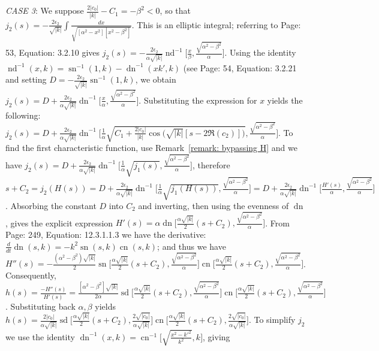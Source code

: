 \documentclass[12pt]{article}
\theoremstyle{plain}
\theoremstyle{definition}
\theoremstyle{remark}
\begin{document}
  
  \textit{CASE 3}: We suppose \(\tfrac{2|c_0|}{|k|}-C_1=-\beta^2<0\), so that \(j_2(s)=-\tfrac{2\epsilon_2}{\sqrt{|k|}}\int \tfrac{dx}{\sqrt{[\alpha^2-x^2][x^2-\beta^2]}}\). This is an elliptic integral; referring to \cite{La} Page: 53, Equation: 3.2.10 gives \(j_2(s)=-\tfrac{2\epsilon_2}{\alpha\sqrt{|k|}}\operatorname{nd}^{-1}\!\big[\tfrac{x}{\beta},\frac{\sqrt{\alpha^2-\beta^2}}{\alpha}\big]\). Using the identity \(\operatorname{nd}^{-1}(x,k)=\operatorname{sn}^{-1}(1,k)-\operatorname{dn}^{-1}(xk',k)\) (see \cite{La} Page: 54, Equation: 3.2.21 and setting \(D=-\tfrac{2\epsilon_2}{\sqrt{|k|}}\operatorname{sn}^{-1}(1,k)\), we obtain \(j_2(s)=D+\tfrac{2\epsilon_2}{\alpha\sqrt{|k|}}\operatorname{dn}^{-1}\!\big[\tfrac{x}{\alpha},\frac{\sqrt{\alpha^2-\beta^2}}{\alpha}\big]\). Substituting the expression for \(x\) yields the following: \footnotesize\(j_2(s)=D+\tfrac{2\epsilon_2}{\alpha\sqrt{|k|}}\operatorname{dn}^{-1}\!\big[\tfrac{1}{\alpha}\sqrt{C_1 + \tfrac{2|c_0|}{|k|}\cos\!\big(\sqrt{|k|}[s-2\Re(c_2)]\big)},\frac{\sqrt{\alpha^2-\beta^2}}{\alpha}\big]\)\normalsize. To find the first characteristic function, use Remark~\ref{remark: bypassing H} and we have \footnotesize\(j_2(s)=D+\tfrac{2\epsilon_2}{\alpha\sqrt{|k|}}\operatorname{dn}^{-1}\!\big[\tfrac{1}{\alpha}\sqrt{j_1(s)},\frac{\sqrt{\alpha^2-\beta^2}}{\alpha}\big]\)\normalsize, therefore \footnotesize\(s+C_2=j_2(H(s))=D+\tfrac{2\epsilon_2}{\alpha\sqrt{|k|}}\operatorname{dn}^{-1}\!\big[\tfrac{1}{\alpha}\sqrt{j_1(H(s))},\frac{\sqrt{\alpha^2-\beta^2}}{\alpha}\big]=D+\tfrac{2\epsilon_2}{\alpha\sqrt{|k|}}\operatorname{dn}^{-1}\!\big[\tfrac{H'(s)}{\alpha},\frac{\sqrt{\alpha^2-\beta^2}}{\alpha}\big]\)\normalsize. Absorbing the constant \(D\) into \(C_2\) and inverting, then using the evenness of \(\operatorname{dn}\), gives the explicit expression \footnotesize\(H'(s)=\alpha\operatorname{dn}\!\big[\tfrac{\alpha\sqrt{|k|}}{2}(s+C_2), \frac{\sqrt{\alpha^2-\beta^2}}{\alpha}\big]\)\normalsize. From \cite{JD} Page: 249, Equation: 12.3.1.1.3 we have the derivative:  \(\tfrac{d}{dt}\operatorname{dn}(s,k)=-k^2\operatorname{sn}(s,k)\operatorname{cn}(s,k)\); and thus we have \footnotesize\(H''(s)=-\tfrac{(\alpha^2-\beta^2)\sqrt{|k|}}{2}\operatorname{sn}\!\big[\tfrac{\alpha\sqrt{|k|}}{2}(s+C_2), \frac{\sqrt{\alpha^2-\beta^2}}{\alpha}\big]\operatorname{cn}\!\big[\tfrac{\alpha\sqrt{|k|}}{2}(s+C_2), \frac{\sqrt{\alpha^2-\beta^2}}{\alpha}\big]\)\normalsize. Consequently, \footnotesize\(h(s)=\tfrac{-H''(s)}{H'(s)}=\tfrac{[\alpha^2-\beta^2]\sqrt{|k|}}{2\alpha}\operatorname{sd}\!\big[\tfrac{\alpha\sqrt{|k|}}{2}(s+C_2), \frac{\sqrt{\alpha^2-\beta^2}}{\alpha}\big]\operatorname{cn}\!\big[\tfrac{\alpha\sqrt{|k|}}{2}(s+C_2), \frac{\sqrt{\alpha^2-\beta^2}}{\alpha}\big]\)\normalsize. Substituting back \(\alpha,\beta\) yields \footnotesize\(h(s)=\tfrac{2|c_0|}{\alpha\sqrt{|k|}}\operatorname{sd}\!\big[\tfrac{\alpha\sqrt{|k|}}{2}(s+C_2), \tfrac{2\sqrt{|c_0|}}{\alpha\sqrt{|k|}}\big]\operatorname{cn}\!\big[\tfrac{\alpha\sqrt{|k|}}{2}(s+C_2),\tfrac{2\sqrt{|c_0|}}{\alpha\sqrt{|k|}}\big]\)\normalsize. To simplify \(j_2\) we use the identity \footnotesize\(\operatorname{dn}^{-1}(x,k)=\operatorname{cn}^{-1}\!\big[\sqrt{\tfrac{x^2-k'^2}{k^2}},k\big]\)\normalsize, giving 
\end{document}
